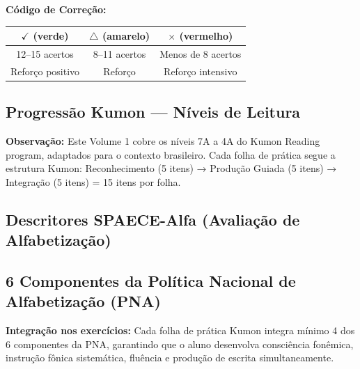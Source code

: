 \textbf{Código de Correção:}
\begin{center}
\begin{tabular}{|c|c|c|}
\hline
$\checkmark$ (verde) & $\triangle$ (amarelo) & $\times$ (vermelho) \\
\hline
12--15 acertos & 8--11 acertos & Menos de 8 acertos \\
Reforço positivo & Reforço & Reforço intensivo \\
\hline
\end{tabular}
\end{center}

\subsection{Progressão Kumon --- Níveis de Leitura}

\kumonprogression

\textbf{Observação:} Este Volume 1 cobre os níveis 7A a 4A do Kumon Reading
program, adaptados para o contexto brasileiro. Cada folha de prática segue
a estrutura Kumon: Reconhecimento (5 itens) → Produção Guiada (5 itens) →
Integração (5 itens) = 15 itens por folha.

\subsection{Descritores SPAECE-Alfa (Avaliação de Alfabetização)}

\spaecealfa

\subsection{6 Componentes da Política Nacional de Alfabetização (PNA)}

\pnacomponents

\textbf{Integração nos exercícios:} Cada folha de prática Kumon integra
mínimo 4 dos 6 componentes da PNA, garantindo que o aluno desenvolva
consciência fonêmica, instrução fônica sistemática, fluência e produção
de escrita simultaneamente.

